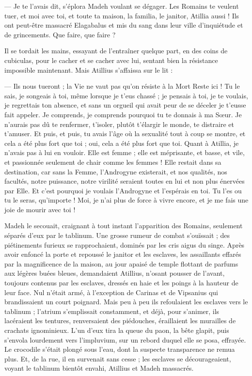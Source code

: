 \documentclass[a4paper, 11pt, oneside, polutonikogreek, french]{article}
\begin{document}
--- Je te l'avais dit, s'éplora Madeh voulant se dégager. Les Romains te veulent tuer, et moi avec toi, et toute ta maison, la familia, le janitor, Atillia aussi ! Ils ont peut-être massacré Elagabalus et mis du sang dans leur ville d'inquiétude et de grincements. Que faire, que faire ?

Il se tordait les mains, essayant de l'entraîner quelque part, en des coins de cubiculas, pour le cacher et se cacher avec lui, sentant bien la résistance impossible maintenant. Mais Atillius s'affaissa sur le lit :

--- Ils nous tueront ; la Vie ne vaut pas qu'on résiste à la Mort Reste ici ! Tu le sais, je songeais à toi, même lorsque je t'eus chassé ; je pensais à toi, je te voulais, je regrettais ton absence, et sans un orgueil qui avait peur de se déceler je t'eusse fait appeler. Je comprends, je comprends pourquoi tu te donnais à ma Sœur. Je n'aurais pas dû te renfermer, t'isoler, plutôt t'élargir le monde, te distraire et t'amuser. Et puis, et puis, tu avais l'âge où la sexualité tout à coup se montre, et cela a été plus fort que toi ; oui, cela a été plus fort que toi. Quant à Atillia, je n'avais pas à lui en vouloir. Elle est femme ; elle est méprisante, et basse, et vile, et passionnée seulement de chair comme les femmes ! Elle restait dans sa destination, car sans la Femme, l'Androgyne existerait, et nos qualités, nos facultés, notre puissance, notre virilité seraient toutes en lui et non plus énervées par Elle. Et c'est pourquoi je voulais l'Androgyne et l'espérais en toi. Tu l'es ou tu le seras, qu’importe ! Moi, je n'ai plus de force à vivre encore, et je me fais une joie de mourir avec toi !

Madeh le secouait, craignant à tout instant l'apparition des Romains, seulement séparés d'eux par le tablinum. Une grosse rumeur de combat s'ouïssait ; des piétinements furieux se rapprochaient, dominés par les cris aigus du singe. Après avoir enfoncé la porte et repoussé le janitor et les esclaves, les assaillants effarés par la magnificence de la maison, au jour apaisé de temple flottant de parfums aux légères buées bleues, demandaient Atillius, n'osant pousser de l'avant, toujours contenus par les esclaves, dressés en haie et les poings à la hauteur de leur face. Nul n'était armé, à l'exception de Carinas et de Vipsanius qui brandissaient un court poignard. Mais peu à peu ils refoulaient les esclaves vers le tablinum ; l'atrium s'emplissait constamment, et déjà, pour s'animer, ils lacéraient les tentures, renversaient des piédouches, éraillaient les murailles de crachats ignominieux. L'un d'eux tira la queue du paon, la bête glapit, puis s'envola lourdement vers l'impluvium, sur un rebord duquel elle se posa, effrayée. Le crocodile s'était plongé sous l'eau, dont la suspecte transparence ne remua plus. Et, de la rue, il en survenait sans cesse ; les esclaves se décourageaient, voyant le tablinum bientôt envahi, Atillius et Madeh massacrés.
\end{document}
